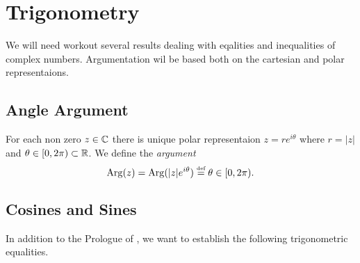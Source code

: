 
\section{Trigonometry}

We will need workout several results dealing with 
eqalities and inequalities of complex numbers.
Argumentation wil be based both on the cartesian and polar representaions.

\subsection{Angle Argument}

For each non zero \(z\in\mathbb{C}\) there is unique polar representaion
\(z=re^{i\theta}\) where \(r=|z|\) and \(\theta\in[0,2\pi) \subset \mathbb{R}\).
We define the \emph{argument}
\begin{equation} \label{eq:arg}
\mathop{\rm Arg}\nolimits(z) = \mathop{\rm Arg}\nolimits(|z|e^{i\theta}) \stackrel{\mbox{\upshape\tiny def}}{=} \theta \in [0,2\pi).
\end{equation}


\subsection{Cosines and Sines}

In addition to the Prologue of \cite{RudinRCA80}, we want to establish
the following trigonometric equalities.

